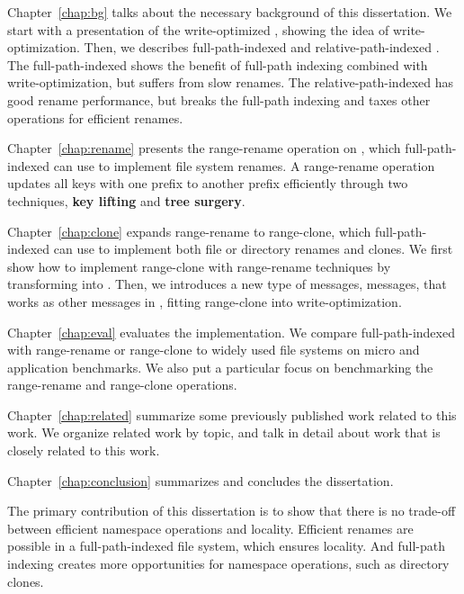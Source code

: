 Chapter~\ref{chap:bg} talks about the necessary background of this dissertation.
We start with a presentation of the write-optimized \bets,
showing the idea of write-optimization.
Then, we describes full-path-indexed \betrfs and relative-path-indexed \betrfs.
The full-path-indexed \betrfs shows the benefit of full-path indexing combined
with write-optimization, but suffers from slow renames.
The relative-path-indexed \betrfs has good rename performance, but breaks the
full-path indexing and taxes other operations for efficient renames.

Chapter~\ref{chap:rename} presents the range-rename operation on \bets,
which full-path-indexed \betrfs can use to implement file system renames.
A range-rename operation updates all keys with one prefix to another prefix
efficiently through two techniques,
\textbf{key lifting} and \textbf{tree surgery}.

Chapter~\ref{chap:clone} expands range-rename to range-clone,
which full-path-indexed \betrfs can use to implement both file or directory
renames and clones.
We first show how to implement range-clone with range-rename techniques by
transforming \bets into \bedags.
Then, we introduces a new type of messages, \goto messages, that works as other
messages in \bedags, fitting range-clone into write-optimization.

Chapter~\ref{chap:eval} evaluates the implementation.
We compare full-path-indexed \betrfs with range-rename or range-clone to
widely used file systems on micro and application benchmarks.
We also put a particular focus on benchmarking the range-rename and range-clone
operations.

Chapter~\ref{chap:related} summarize some previously published work related to
this work.
We organize related work by topic, and talk in detail about work that is closely
related to this work.

Chapter~\ref{chap:conclusion} summarizes and concludes the dissertation.

The primary contribution of this dissertation is to show that there is no
trade-off between efficient namespace operations and locality.
Efficient renames are possible in a full-path-indexed file system, which ensures
locality.
And full-path indexing creates more opportunities for namespace operations,
such as directory clones.


